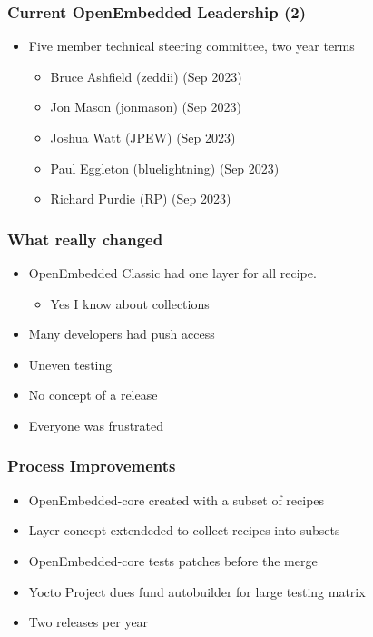 \documentclass{beamer}
\begin{document}
\begin{frame}
	\frametitle{Current OpenEmbedded Leadership (2)}

	\begin{itemize}
		\item Five member technical steering committee, two year terms
			\begin{itemize}
				\item Bruce Ashfield (zeddii) (Sep 2023)
				\item Jon Mason (jonmason) (Sep 2023)
				\item Joshua Watt (JPEW) (Sep 2023)
				\item Paul Eggleton (bluelightning) (Sep 2023)
				\item Richard Purdie (RP) (Sep 2023)
			\end{itemize}
	\end{itemize}
\end{frame}


\begin{frame}
\frametitle{What really changed}

\begin{itemize}
	\item OpenEmbedded Classic had one layer for all recipe.
		\begin{itemize}
			\item Yes I know about collections
		\end{itemize}
	\item Many developers had push access
	\item Uneven testing
	\item No concept of a release
	\item Everyone was frustrated
\end{itemize}

\end{frame}

\begin{frame}
\frametitle{Process Improvements}

\begin{itemize}
	\item OpenEmbedded-core created with a subset of recipes
	\item Layer concept extendeded to collect recipes into subsets
	\item OpenEmbedded-core tests patches before the merge
	\item Yocto Project dues fund autobuilder for large testing matrix
	\item Two releases per year
\end{itemize}

\end{frame}
\end{document}
